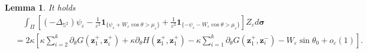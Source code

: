 \documentclass[12pt,reqno]{amsart}
\numberwithin{equation}{section}
\newtheorem{lemma}[theorem]{Lemma}
\theoremstyle{definition}
\theoremstyle{remark}
\begin{document}
	\begin{lemma}\label{lem2-6}
		It holds
		\begin{align*}
			&\quad\int_\Pi\left[(-\Delta_{\mathbb S^2})\psi_\varepsilon-\frac{1}{\varepsilon^2}\boldsymbol1_{\{\psi_\varepsilon+W_\varepsilon\cos\theta>\mu_\varepsilon\}}+\frac{1}{\varepsilon^2}\boldsymbol1_{\{-\psi_\varepsilon-W_\varepsilon\cos\theta>\mu_\varepsilon\}}\right]Z_\varepsilon d\boldsymbol\sigma\\
			&=2\kappa\left[\kappa\sum\limits_{i=2}^k\partial_\theta G(\boldsymbol z_1^+,\boldsymbol z_i^+)+ \kappa \partial_\theta H(\boldsymbol z_1^+,\boldsymbol z_1^+)-\kappa\sum\limits_{i=1}^k\partial_\theta G(\boldsymbol z_1^+,\boldsymbol z_i^-)-W_\varepsilon\sin\theta_0+o_\varepsilon(1)\right].
		\end{align*}
	\end{lemma}
\end{document}
